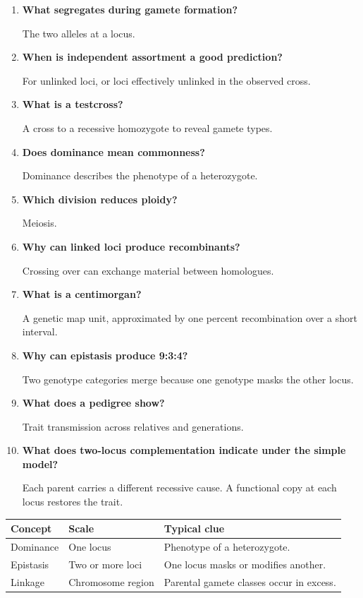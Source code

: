 \documentclass[12pt,a4paper]{article}
\newcommand{\Q}[1]{\textbf{#1}\par\noindent\ignorespaces}
\begin{document}
\begin{tcolorbox}[exambox, title={Frequently Asked / Viva Questions}]
\begin{enumerate}[topsep=0pt, label=\textbf{Q\arabic*.}, itemsep=5pt, leftmargin=*]
  \item \Q{What segregates during gamete formation?}
    The two alleles at a locus.
  \item \Q{When is independent assortment a good prediction?}
    For unlinked loci, or loci effectively unlinked in the observed cross.
  \item \Q{What is a testcross?}
    A cross to a recessive homozygote to reveal gamete types.
  \item \Q{Does dominance mean commonness?}
    Dominance describes the phenotype of a heterozygote.
  \item \Q{Which division reduces ploidy?}
    Meiosis.
  \item \Q{Why can linked loci produce recombinants?}
    Crossing over can exchange material between homologues.
  \item \Q{What is a centimorgan?}
    A genetic map unit, approximated by one percent recombination over a short interval.
  \item \Q{Why can epistasis produce 9:3:4?}
    Two genotype categories merge because one genotype masks the other locus.
  \item \Q{What does a pedigree show?}
    Trait transmission across relatives and generations.
  \item \Q{What does two-locus complementation indicate under the simple model?}
    Each parent carries a different recessive cause. A functional copy at each locus restores the trait.
\end{enumerate}
\end{tcolorbox}

\begin{tcolorbox}[tikzbox, title={Summary Comparison}]
\par\vspace{5pt}
\begingroup
\setlength{\extrarowheight}{1pt}
\noindent\begin{tabularx}{\linewidth}{|B{3.45cm}|Y|Y|}
\hline
\textbf{Concept} & \textbf{Scale} & \textbf{Typical clue} \\ \hline
Dominance & One locus & Phenotype of a heterozygote. \\ \hline
Epistasis & Two or more loci & One locus masks or modifies another. \\ \hline
Linkage & Chromosome region & Parental gamete classes occur in excess. \\ \hline
\end{tabularx}\par
\endgroup
\end{tcolorbox}
\end{document}
